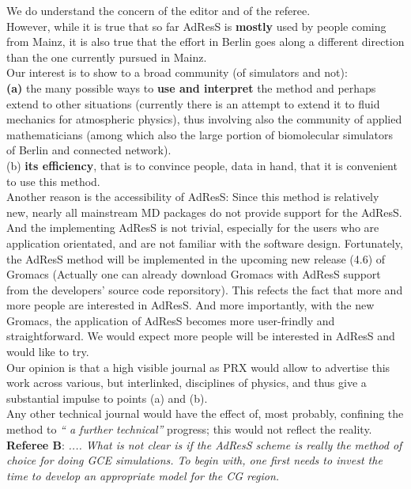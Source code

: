 \documentclass[12pt,a4paper]{article}
\newcommand{\bluec}[1]{{\color{blue} #1}}
\begin{document}
We do understand the concern of the editor and of the referee.\\
However, while it is true that so far AdResS is {\bf mostly} used by people coming from Mainz,
it is also true that the effort in Berlin goes along a different direction than the one currently pursued 
in Mainz.\\
Our interest is to show to a broad community (of simulators and not):\\
{\bf (a)} the many possible ways to {\bf use and interpret} the method and perhaps extend to other situations (currently there is an attempt to extend it to fluid mechanics for atmospheric physics), thus involving also the community of applied mathematicians (among which also the large portion of biomolecular simulators of Berlin and connected network).\\

(b) {\bf its efficiency}, that is to convince people, data in hand, that it is convenient to use this method.\\

\bluec{
  Another reason is the accessibility of AdResS: Since this method
  is relatively new, nearly all mainstream MD packages do not provide
  support for the AdResS.
  And the implementing AdResS is not trivial, especially
  for the users who are
  application orientated, and are not familiar with the software design.
  Fortunately, the AdResS method will be implemented in the
  upcoming new release (4.6) of Gromacs (Actually one can already
  download Gromacs with AdResS support from the developers' source
  code reporsitory).
  This refects the fact that more
  and more people are interested in AdResS.  And more importantly, with the
  new Gromacs, the application of AdResS becomes more
  user-frindly and straightforward. We would expect more people will
  be interested in AdResS and would like to try.
}\\

Our opinion is that a high visible journal as PRX would allow to advertise this work across various, but interlinked, disciplines of physics, and thus give a substantial impulse to points (a) and (b).\\
Any other technical journal would have the effect of, most probably, confining the method to {\it `` a further technical''} progress; this would not reflect the reality.\\


{\bf Referee B}:
{\color{teal} {\it.... What is not
clear is if the AdResS scheme is really the method of choice for doing GCE simulations. To begin with,
one first needs to invest the time to develop an appropriate model for the CG region.}}\\
\end{document}

